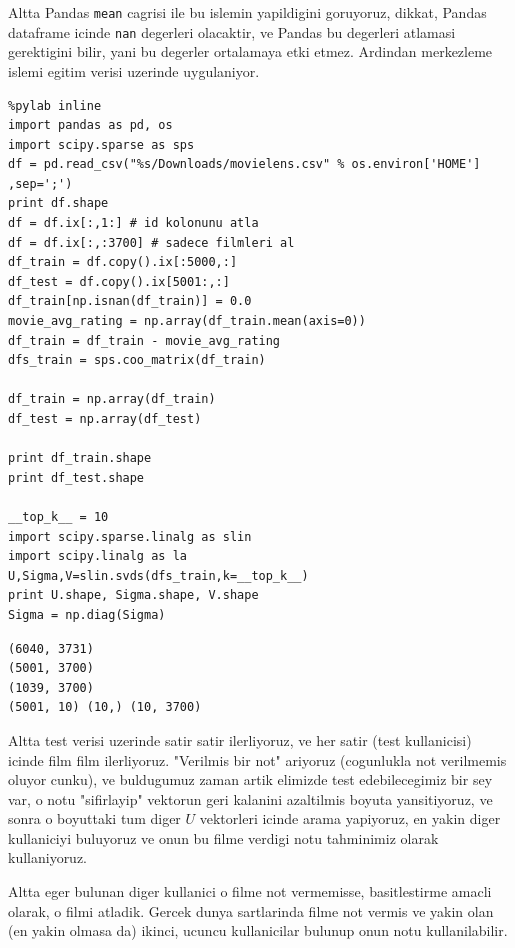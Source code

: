 \documentclass[12pt,fleqn]{article}\usepackage{../common}
\begin{document}
Altta Pandas \verb!mean! cagrisi ile bu islemin yapildigini
goruyoruz, dikkat, Pandas dataframe icinde \verb!nan! degerleri
olacaktir, ve Pandas bu degerleri atlamasi gerektigini bilir, yani bu
degerler ortalamaya etki etmez. Ardindan merkezleme islemi egitim
verisi uzerinde uygulaniyor.

\begin{verbatim}
%pylab inline
import pandas as pd, os
import scipy.sparse as sps
df = pd.read_csv("%s/Downloads/movielens.csv" % os.environ['HOME'] ,sep=';')
print df.shape
df = df.ix[:,1:] # id kolonunu atla
df = df.ix[:,:3700] # sadece filmleri al
df_train = df.copy().ix[:5000,:]
df_test = df.copy().ix[5001:,:]
df_train[np.isnan(df_train)] = 0.0
movie_avg_rating = np.array(df_train.mean(axis=0))
df_train = df_train - movie_avg_rating
dfs_train = sps.coo_matrix(df_train)

df_train = np.array(df_train)
df_test = np.array(df_test)

print df_train.shape
print df_test.shape

__top_k__ = 10
import scipy.sparse.linalg as slin
import scipy.linalg as la
U,Sigma,V=slin.svds(dfs_train,k=__top_k__)
print U.shape, Sigma.shape, V.shape
Sigma = np.diag(Sigma)
\end{verbatim}

\begin{verbatim}
(6040, 3731)
(5001, 3700)
(1039, 3700)
(5001, 10) (10,) (10, 3700)
\end{verbatim}

Altta test verisi uzerinde satir satir ilerliyoruz, ve her satir (test
kullanicisi) icinde film film ilerliyoruz. "Verilmis bir not" ariyoruz
(cogunlukla not verilmemis oluyor cunku), ve buldugumuz zaman artik
elimizde test edebilecegimiz bir sey var, o notu "sifirlayip" vektorun
geri kalanini azaltilmis boyuta yansitiyoruz, ve sonra o boyuttaki tum
diger $U$ vektorleri icinde arama yapiyoruz, en yakin diger
kullaniciyi buluyoruz ve onun bu filme verdigi notu tahminimiz olarak
kullaniyoruz.

Altta eger bulunan diger kullanici o filme not vermemisse,
basitlestirme amacli olarak, o filmi atladik. Gercek dunya sartlarinda
filme not vermis ve yakin olan (en yakin olmasa da) ikinci, ucuncu
kullanicilar bulunup onun notu kullanilabilir.
\end{document}
